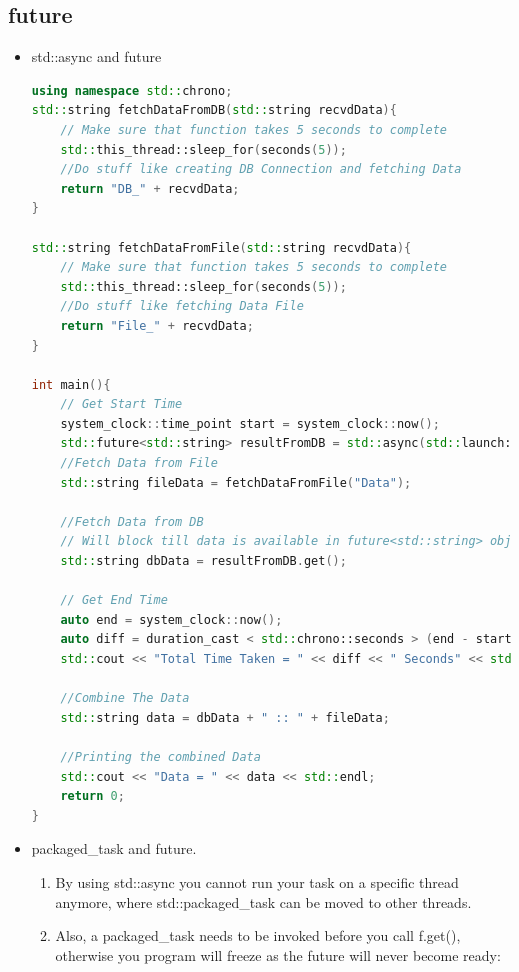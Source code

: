\documentclass[a4paper,11pt,twoside]{book}
\begin{document}
\subsection{future}

\begin{itemize}
	\item std::async and future
	
\begin{lstlisting}[frame=single, language=c++]
using namespace std::chrono;
std::string fetchDataFromDB(std::string recvdData){
	// Make sure that function takes 5 seconds to complete
	std::this_thread::sleep_for(seconds(5));
	//Do stuff like creating DB Connection and fetching Data
	return "DB_" + recvdData;
}

std::string fetchDataFromFile(std::string recvdData){
	// Make sure that function takes 5 seconds to complete
	std::this_thread::sleep_for(seconds(5));
	//Do stuff like fetching Data File
	return "File_" + recvdData;
}

int main(){
	// Get Start Time
	system_clock::time_point start = system_clock::now();
	std::future<std::string> resultFromDB = std::async(std::launch::async, fetchDataFromDB, "Data");
	//Fetch Data from File
	std::string fileData = fetchDataFromFile("Data");
	
	//Fetch Data from DB
	// Will block till data is available in future<std::string> object.
	std::string dbData = resultFromDB.get();
	
	// Get End Time
	auto end = system_clock::now();
	auto diff = duration_cast < std::chrono::seconds > (end - start).count();
	std::cout << "Total Time Taken = " << diff << " Seconds" << std::endl;
	
	//Combine The Data
	std::string data = dbData + " :: " + fileData;
	
	//Printing the combined Data
	std::cout << "Data = " << data << std::endl;
	return 0;
}
\end{lstlisting}	

\item packaged\_task and future. 
\begin{enumerate}
	\item By using std::async you cannot run your task on a specific thread anymore, where std::packaged\_task can be moved to other threads.
	
	\item Also, a packaged\_task needs to be invoked before you call f.get(), otherwise you program will freeze as the future will never become ready:
	

\end{enumerate}
\end{itemize}
\end{document}

